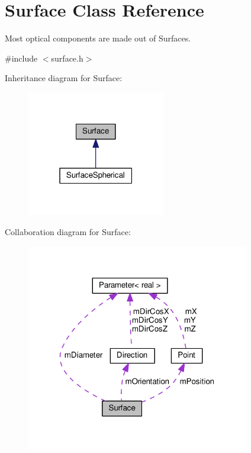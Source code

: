 \hypertarget{classSurface}{}\section{Surface Class Reference}
\label{classSurface}


Most optical components are made out of Surfaces.  




{\ttfamily \#include $<$surface.\+h$>$}



Inheritance diagram for Surface\+:\nopagebreak
\begin{figure}[H]
\begin{center}
\leavevmode
\includegraphics[width=171pt]{classSurface__inherit__graph}
\end{center}
\end{figure}


Collaboration diagram for Surface\+:
\nopagebreak
\begin{figure}[H]
\begin{center}
\leavevmode
\includegraphics[width=276pt]{classSurface__coll__graph}
\end{center}
\end{figure}
